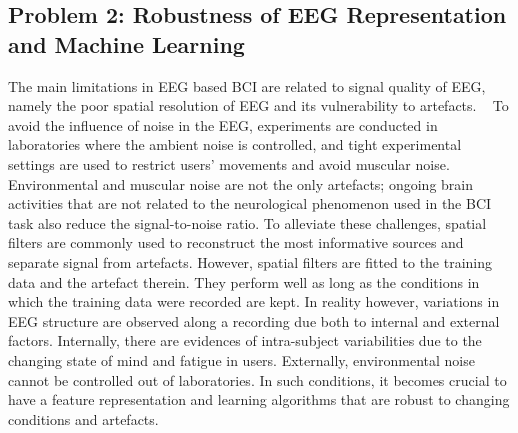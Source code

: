 
\subsection*{Problem 2: Robustness of EEG Representation and Machine Learning}

The main limitations in EEG based BCI are related to signal quality of EEG, namely the poor spatial resolution of EEG and its vulnerability to artefacts. ~%
To avoid the influence of noise in the EEG, experiments are conducted in laboratories where the ambient noise is controlled, and tight experimental settings are used to restrict users' movements and avoid muscular noise. 
Environmental and muscular noise are not the only artefacts; ongoing brain activities that are not related to the neurological phenomenon used in the BCI task also reduce the signal-to-noise ratio.  
To alleviate these challenges, spatial filters are commonly used to reconstruct the most informative sources and separate signal from artefacts. 
However, spatial filters are fitted to the training data and the artefact therein. 
They perform well as long as the conditions in which the training data were recorded are kept. 
In reality however, variations in EEG structure are observed along a recording due both to internal and external factors. 
Internally, there are evidences of intra-subject variabilities due to the changing state of mind and fatigue in users.
Externally, environmental noise cannot be controlled out of laboratories.   
In such conditions, it becomes crucial to have a feature representation and learning algorithms that are robust to changing conditions and artefacts. 

